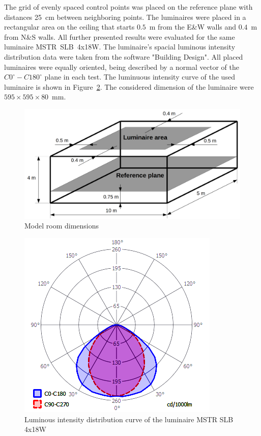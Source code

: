 The grid of evenly spaced control points was placed on the reference plane with distances 25~cm between neighboring points. The luminaires were placed in a rectangular area on the ceiling that starts $0.5$~m from the E\&W walls and $0.4$~m from N\&S walls. All further presented results were evaluated for the same luminaire  MSTR~SLB~4x18W. The luminaire's spacial luminous intensity distribution data were taken from the software "Building Design". All placed luminaires were equally oriented, being described by a normal vector of the $C0^\circ-C180^\circ$ plane in each test. The luminuous intensity curve of the used luminaire is shown in Figure~\ref{fig:IDiag}. The considered dimension of the luminaire were $595\times 595\times 80$~mm.

\begin{figure}[htb]
  \centering
  \includegraphics[width=\columnwidth]{modRoom}
  \caption{Model room dimensions}
  \label{fig:modRoom}
\end{figure}

\begin{figure}[htb]
  \centering
  \includegraphics[width=0.8\columnwidth]{IDiag}
  \caption{Luminous intensity distribution curve of the luminaire MSTR SLB 4x18W}
  \label{fig:IDiag}
\end{figure}